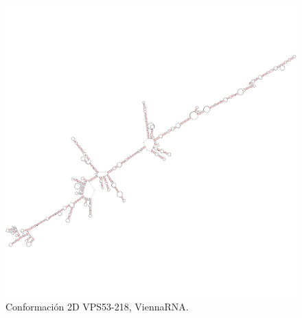 \documentclass[a4paper,11pt,titlepage]{article}
\theoremstyle{definition}
\begin{document}
\begin{figure}[H]
\begin{minipage}[c]{0.45\textwidth}
        \includegraphics[width=\textwidth]{images/VPS53-218-db_vrna.png}
        \caption{Conformación 2D VPS53-218, ViennaRNA.}
        \label{fig:VPS53-218-vrna}
    \end{minipage}
\end{figure}
\end{document}
